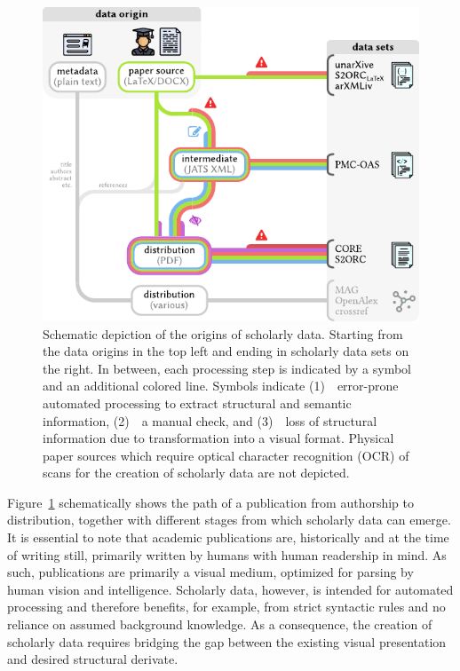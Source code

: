 \begin{figure}[bt]
  \centering
  \includegraphics[width=\linewidth]{figures/foundations/scholarly_data_lifecycle_ystretch}
  \caption[Schematic depiction of the origins of scholarly data]{Schematic depiction of the origins of scholarly data. Starting from the data origins in the top left and ending in scholarly data sets on the right. In between, each processing step is indicated by a symbol and an additional colored line. Symbols indicate (1)~{\color{warningsign-red}\faWarning}~error-prone automated processing to extract structural and semantic information, (2)~{\color{manualcheck-blue}\faPencilSquareO}~a manual check, and (3)~{\color{visualformat-purple}\faLowVision}~loss of structural information due to transformation into a visual format. Physical paper sources which require optical character recognition (OCR) of scans for the creation of scholarly data are not depicted.}
  \label{fig:foundations-datalifecycle}
\end{figure}

Figure~\ref{fig:foundations-datalifecycle} schematically shows the path of a publication from authorship to distribution, together with different stages from which scholarly data can emerge. It is essential to note that academic publications are, historically and at the time of writing still, primarily written by humans with human readership in mind. As such, publications are primarily a visual medium, optimized for parsing by human vision and intelligence. Scholarly data, however, is intended for automated processing and therefore benefits, for example, from strict syntactic rules and no reliance on assumed background knowledge. As a consequence, the creation of scholarly data requires bridging the gap between the existing visual presentation and desired structural derivate.

